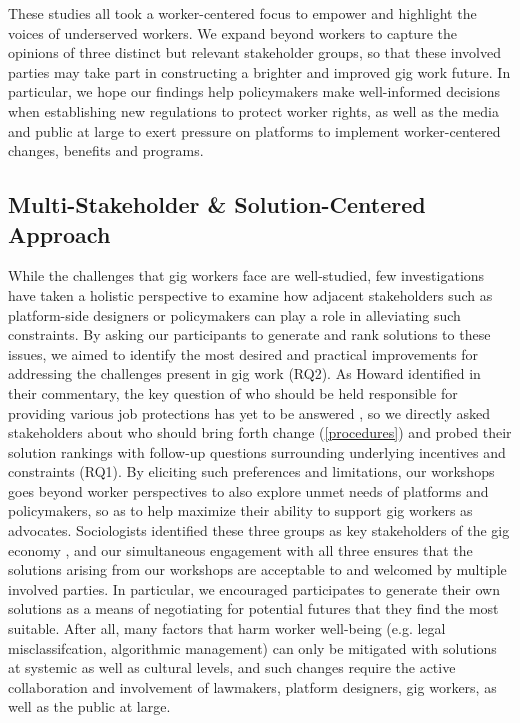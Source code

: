 These studies all took a worker-centered focus to empower and highlight the voices of underserved workers. We expand beyond workers to capture the opinions of three distinct but relevant stakeholder groups, so that these involved parties may take part in constructing a brighter and improved gig work future. In particular, we hope our findings help policymakers make well-informed decisions when establishing new regulations to protect worker rights, as well as the media and public at large to exert pressure on platforms to implement worker-centered changes, benefits and programs.

\subsection{Multi-Stakeholder \& Solution-Centered Approach}

While the challenges that gig workers face are well-studied, few investigations have taken a holistic perspective to examine how adjacent stakeholders such as platform-side designers or policymakers can play a role in alleviating such constraints. 
By asking our participants to generate and rank solutions to these issues, we aimed to identify the most desired and practical improvements for addressing the challenges present in gig work (RQ2). As Howard identified in their commentary, the key question of who should be held responsible for providing various job protections has yet to be answered \cite{Howard2017-wd}, so we directly asked stakeholders about who should bring forth change (\ref{procedures}) and probed their solution rankings with follow-up questions surrounding underlying incentives and constraints (RQ1).
By eliciting such preferences and limitations, our workshops goes beyond worker perspectives to also explore unmet needs of platforms and policymakers, so as to help maximize their ability to support gig workers as advocates. 
Sociologists identified these three groups as key stakeholders of the gig economy \cite{vallas2020platforms}, and our simultaneous engagement with all three ensures that the solutions arising from our workshops are acceptable to and welcomed by multiple involved parties. 
In particular, we encouraged participates to generate their own solutions as a means of negotiating for potential futures that they find the most suitable. 
After all, many factors that harm worker well-being (e.g. legal misclassifcation, algorithmic management) can only be mitigated with solutions at systemic as well as cultural levels, and such changes require the active collaboration and involvement of lawmakers, platform designers, gig workers, as well as the public at large.

